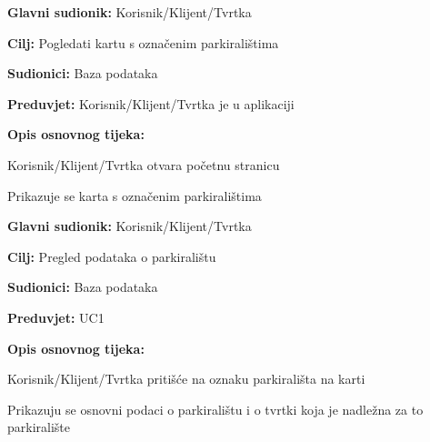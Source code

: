 \noindent {}
\begin{packed_item}
	
	\item \textbf{Glavni sudionik: } Korisnik/Klijent/Tvrtka
	\item \textbf{Cilj:} Pogledati kartu s označenim parkiralištima
	\item \textbf{Sudionici:} Baza podataka
	\item \textbf{Preduvjet:} Korisnik/Klijent/Tvrtka je u aplikaciji
	\item \textbf{Opis osnovnog tijeka:}
	
	\item[] \begin{packed_enum}
		
		\item Korisnik/Klijent/Tvrtka otvara početnu stranicu
		\item Prikazuje se karta s označenim parkiralištima

	\end{packed_enum}
	
\end{packed_item}

\noindent {}
\begin{packed_item}
	
	\item \textbf{Glavni sudionik:} Korisnik/Klijent/Tvrtka
	\item \textbf{Cilj:} Pregled podataka o parkiralištu
	\item \textbf{Sudionici:} Baza podataka
	\item \textbf{Preduvjet:} UC1
	\item \textbf{Opis osnovnog tijeka:}
	
	\item[] \begin{packed_enum}
		
		\item Korisnik/Klijent/Tvrtka pritišće na oznaku parkirališta na karti
		\item Prikazuju se osnovni podaci o parkiralištu i o tvrtki koja je nadležna za to parkiralište

	\end{packed_enum}
\end{packed_item}

\pagebreak

